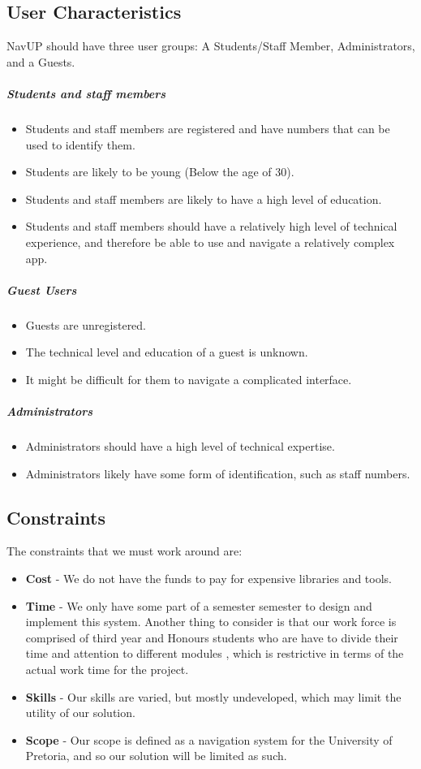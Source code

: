 \documentclass[english]{article}
\begin{document}
		\subsection{User Characteristics}
				NavUP should have three user groups: A Students/Staff Member, Administrators, and a Guests.
				\subparagraph{Students and staff members}
    				\begin{itemize}
    					\item Students and staff members are registered and have numbers that can be used to identify them.
    					\item Students are likely to be young (Below the age of 30).
    					\item Students and staff members are likely to have a high level of education.
    					\item Students and staff members should have a relatively high level of technical experience, and therefore be able to use and navigate a relatively complex app.
    				\end{itemize}
				\subparagraph{Guest Users}
    				\begin{itemize}
    					\item Guests are unregistered.
    					\item The technical level and education of a guest is unknown. 
    					\item It might be difficult for them to navigate a complicated interface.
    
    				\end{itemize}
				\subparagraph{Administrators}
    				\begin{itemize}
    					\item Administrators should have a high level of technical expertise.
    					\item Administrators likely have some form of identification, such as staff numbers.
    				\end{itemize}
		\subsection{Constraints}
                The constraints that we must work around are:
			    \begin{itemize}
			        \item \textbf{Cost} - We do not have the funds to pay for expensive libraries and tools.
			        \item \textbf{Time} - We only have some part of a semester semester to design and implement this system. Another thing to consider is that our work force is comprised of third year and Honours students who are have to divide their time and attention to different modules , which is restrictive in terms of the actual work time for the project.
			        \item \textbf{Skills} - Our skills are varied, but mostly undeveloped, which may limit the utility of our solution.
			        \item \textbf{Scope} - Our scope is defined as a navigation system for the University of Pretoria, and so our solution will be limited as such.
			    \end{itemize}
\end{document}
